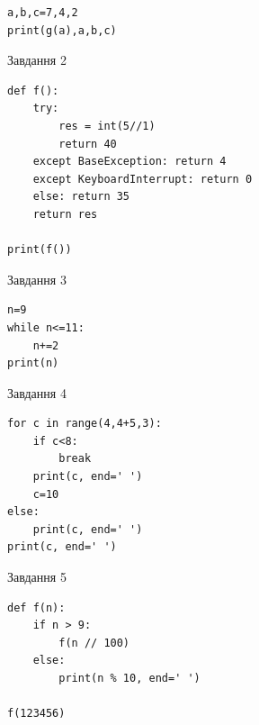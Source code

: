 \documentclass[12pt, ukrainian]{article}
\begin{document}
{{{{{{{{{{{{{{{{{{{\begin{minipage}[t]{8.5cm}
\begin{verbatim}
a,b,c=7,4,2
print(g(a),a,b,c)
\end{verbatim}


\vspace{5mm}
               
{\begin{center}Завдання {2}\end{center}}
\vspace{-6mm}

\begin{verbatim}
def f():
    try:
        res = int(5//1)
        return 40
    except BaseException: return 4
    except KeyboardInterrupt: return 0
    else: return 35
    return res

print(f())
\end{verbatim}


\vspace{5mm}
               
{\begin{center}Завдання {3}\end{center}}
\vspace{-6mm}

\begin{verbatim}
n=9
while n<=11:
    n+=2
print(n)
\end{verbatim}


\end{minipage}
\vline \hspace{6mm}
\begin{minipage}[t]{10.7cm}
               
{\begin{center}Завдання {4}\end{center}}
\vspace{-6mm}

\begin{verbatim}
for c in range(4,4+5,3):
    if c<8:
        break
    print(c, end=' ')
    c=10
else:
    print(c, end=' ')
print(c, end=' ')
\end{verbatim}


\vspace{5mm}
               
{\begin{center}Завдання {5}\end{center}}
\vspace{-6mm}

\begin{verbatim}
def f(n):
    if n > 9:
        f(n // 100)
    else:
        print(n % 10, end=' ')

f(123456)
\end{verbatim}



\end{minipage}}}}}}}}}}}}}}}}}}}}
\end{document}
